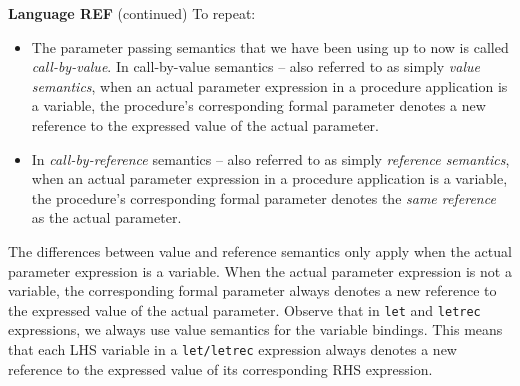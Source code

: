 \begin{minipage}[t]{\sw}
\slidenumber
\LARGE
{\bf Language REF} (continued)\exx
To repeat:
\begin{itemize}
\item
  The parameter passing semantics
  that we have been using up to now
  is called {\em call-by-value}.
  In call-by-value semantics --
  also referred to as simply {\em value semantics},
  when an actual parameter expression
  in a procedure application is a variable,
  the procedure's corresponding formal parameter denotes
  a new reference to the expressed value
  of the actual parameter.
\item
  In {\em call-by-reference} semantics --
  also referred to as simply {\em reference semantics},
  when an actual parameter expression
  in a procedure application is a variable,
  the procedure's corresponding formal parameter denotes
  the {\em same reference} as the actual parameter.
\end{itemize}
The differences between value and reference semantics
only apply when the actual parameter expression is a variable.
When the actual parameter expression is not a variable,
the corresponding formal parameter always denotes
a new reference to the expressed value
of the actual parameter.\exx
Observe that in \verb'let' and \verb'letrec' expressions,
we always use value semantics for the variable bindings.
This means that each LHS variable
in a \verb'let/letrec' expression always denotes
a new reference to the expressed value
of its corresponding RHS expression.
\end{minipage}
\clearpage
